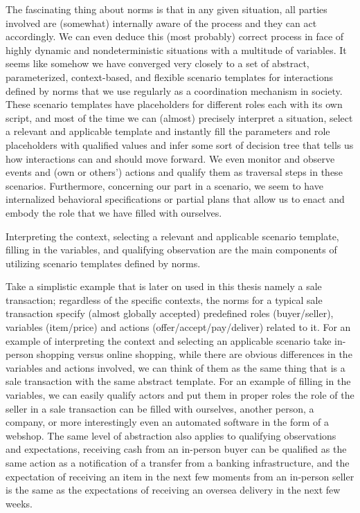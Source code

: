The fascinating thing about norms is that in any given situation, all parties involved are (somewhat) internally aware of the process and they can act accordingly. We can even deduce this (most probably) correct process in face of highly dynamic and nondeterministic situations with a multitude of variables. It seems like somehow we have converged very closely to a set of abstract, parameterized, context-based, and flexible scenario templates for interactions defined by norms that we use regularly as a coordination mechanism in society. These scenario templates have placeholders for different roles each with its own script, and most of the time we can (almost) precisely interpret a situation, select a relevant and applicable template and instantly fill the parameters and role placeholders with qualified values and infer some sort of decision tree that tells us how interactions can and should move forward. We even monitor and observe events and (own or others') actions and qualify them as traversal steps in these scenarios. Furthermore, concerning our part in a scenario, we seem to have internalized behavioral specifications or partial plans that allow us to enact and embody the role that we have filled with ourselves.


Interpreting the context, selecting a relevant and applicable scenario template, filling in the variables, and qualifying observation are the main components of utilizing scenario templates defined by norms. 

Take a simplistic example that is later on used in this thesis namely a sale transaction; regardless of the specific contexts, the norms for a typical sale transaction specify (almost globally accepted) predefined roles (buyer/seller), variables (item/price) and actions (offer/accept/pay/deliver) related to it. For an example of interpreting the context and selecting an applicable scenario take in-person shopping versus online shopping, while there are obvious differences in the variables and actions involved, we can think of them as the same thing that is a sale transaction with the same abstract template. For an example of filling in the variables, we can easily qualify actors and put them in proper roles the role of the seller in a sale transaction can be filled with ourselves, another person, a company, or more interestingly even an automated software in the form of a webshop. The same level of abstraction also applies to qualifying observations and expectations, receiving cash from an in-person buyer can be qualified as the same action as a notification of a transfer from a banking infrastructure, and the expectation of receiving an item in the next few moments from an in-person seller is the same as the expectations of receiving an oversea delivery in the next few weeks.

